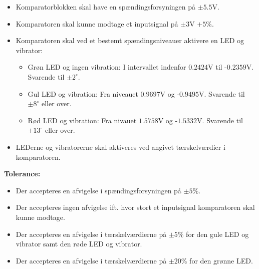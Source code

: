 \begin{itemize}
	\item Komparatorblokken skal have en spændingsforsyningen på $\pm5.5$V.
	\item Komparatoren skal kunne modtage et inputsignal på $\pm3$V $+5\%$.
	\item Komparatoren skal ved et bestemt spændingsniveauer aktivere en LED og vibrator:
	\begin{itemize}
		\item Grøn LED og ingen vibration: I intervallet indenfor $0.2424$V til -$0.2359$V. Svarende til $\pm2^{\circ}$.
		\item Gul LED og vibration: Fra niveauet $0.9697$V og -$0.9495$V. Svarende til $\pm 8^{\circ}$ eller over.
		\item Rød LED og vibration: Fra nivauet $1.5758$V og -$1.5332$V. Svarende til $\pm13^{\circ}$ eller over.
	\end{itemize}
	\item LEDerne og vibratorerne skal aktiveres ved angivet tærskelværdier i komparatoren.
\end{itemize}
\textbf{Tolerance:}
\begin{itemize}
	\item Der accepteres en afvigelse i spændingsforsyningen på $\pm5\%$.
	\item Der accepteres ingen afvigelse ift. hvor stort et inputsignal komparatoren skal kunne modtage.
	\item Der accepteres en afvigelse i tærskelværdierne på $\pm5\%$ for den gule LED og vibrator samt den røde LED og vibrator.
	\item Der accepteres en afvigelse i tærskelværdierne på $\pm20\%$ for den grønne LED. 
\end{itemize}
